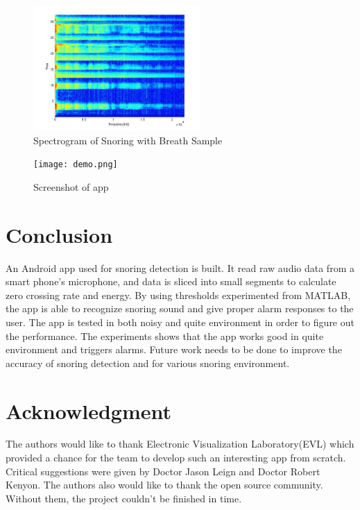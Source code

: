 \documentclass[conference]{IEEEtran}
\begin{document}
\begin{figure}[!t]
\centering
\includegraphics[width=2.5in]{spectrogram.jpg}
\caption{Spectrogram of Snoring with Breath Sample}
\label{fig:spectrogram}
\end{figure}

\begin{figure}[!t]
\texttt{[image: demo.png]}
\centering
\caption{Screenshot of app}
\label{fig:app_screenshot}
\end{figure}





\section{Conclusion}
An Android app used for snoring detection is built. It read raw audio data from a smart phone's microphone, and data is sliced into small segments to calculate zero crossing rate and energy. By using thresholds experimented from MATLAB, the app is able to recognize snoring sound and give proper alarm responses to the user. The app is tested in both noisy and quite environment in order to figure out the performance. The experiments shows that the app works good in quite environment and triggers alarms. Future work needs to be done to improve the accuracy of snoring detection and for various snoring environment.



\section*{Acknowledgment}

The authors would like to thank Electronic Visualization Laboratory(EVL)  which provided a chance for the team to develop such an interesting app from scratch. Critical suggestions were given by Doctor Jason Leign and Doctor Robert Kenyon. The authors also would like to thank the open source community. Without them, the project couldn't be finished in time. \\
\end{document}
